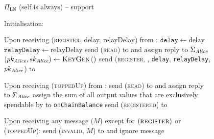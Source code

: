  \begin{figure}[H]
    \begin{protocolbox}{$\Pi_{\mathrm{LN}}$ (self is \alice{} always) --
    support}
      \begin{algorithmic}[1]
        \State Initialisation:
        \Indent
        \EndIndent
        \Statex

        \State Upon receiving (\textsc{register}, delay, relayDelay) from
        \environment:
        \Indent
          \State $\mathtt{delay} \gets \mathrm{delay}$ 
          \label{alg:protocol:support:delay}
          \State $\mathtt{relayDelay} \gets \mathrm{relayDelay}$
          \State send (\textsc{read}) to \ledger{} and assign reply to
          $\Sigma_{\mathit{Alice}}$
          \label{alg:protocol:support:read}
          \State $\left(pk_{\mathit{Alice}}, sk_{\mathit{Alice}}\right) \gets
          \textsc{KeyGen}\left(\right)$
          \label{alg:protocol:support:keygen}
          \State send (\textsc{register}, \alice, \texttt{delay},
          \texttt{relayDelay}, $pk_{\mathit{Alice}}$) to \environment
        \EndIndent
        \Statex

        \State Upon receiving (\textsc{toppedUp}) from \environment:
        \Indent
          \State send (\textsc{read}) to \ledger{} and assign reply to
          $\Sigma_{\mathit{Alice}}$
          \State assign the sum of all output values that are exclusively
          spendable by \alice{} to \texttt{onChainBalance}
          \State send (\textsc{registered}) to \environment
        \EndIndent
        \Statex

        \State Upon receiving any message ($M$) except for
        $\left(\textsc{register}\right)$ or (\textsc{toppedUp}):
        \Indent
            \State send (\textsc{invalid}, $M$) to \environment{} and ignore
            message
          \EndIf
        \EndIndent
        \Statex


\end{algorithmic}
\end{protocolbox}
\end{figure}
